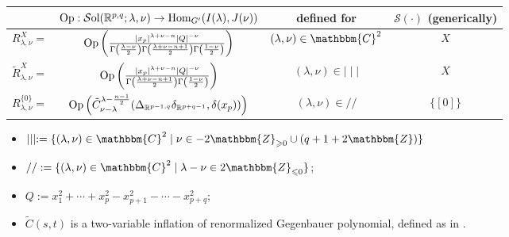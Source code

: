\renewcommand{\arraystretch}{3.5}
\begin{center}
\begin{tabular}{|c|c|c|c|}
  \hline
  & $\operatorname{Op}:\mathcal{S}\mbox{ol}(\mathbb{R}^{p,q};\lambda,\nu)\to\mbox{\normalfont Hom}_{G'}(I(\lambda),J(\nu))$ & defined for &
  $\mathcal{S} (\cdot)$ (generically)\\
  \hline
  $R_{\lambda, \nu}^X=$ & $\mbox{\normalfont Op}\left( \frac{| x_p |^{\lambda + \nu - n} | Q |^{-
  \nu}}{\Gamma \left( \frac{\lambda - \nu}{2} \right) \Gamma \left(
  \frac{\lambda + \nu - n + 1}{2} \right) \Gamma \left( \frac{1 - \nu}{2}
  \right)} \right)$ & $(\lambda,\nu)\in\mathbbm{C}^2$ & $X$\\
  \hline
  $\tilde{R}^X_{\lambda, \nu}=$ & $\mbox{\normalfont Op}\left(  \frac{| x_p |^{\lambda + \nu - n} | Q |^{-
  \nu}}{ \Gamma \left(
  \frac{\lambda + \nu - n + 1}{2} \right) \Gamma \left( \frac{1 - \nu}{2}
  \right)} \right)$ & $(\lambda,\nu)\in\mid \mid \mid$ & $X$\\
  \hline
  $R_{\lambda, \nu}^{\{ 0 \}}=$ & $\mbox{\normalfont Op}\left(  \tilde{C}_{\nu - \lambda}^{\lambda - \frac{n
  - 1}{2}} ({\Delta}_{\mathbb{R}^{p-1,q}} {\delta}_{\mathbb{R}^{p+q-1}}, \delta (x_p)) \right)$ & $(\lambda,\nu)\in/ /$ & $\{ [0]
  \}$\\
  \hline
\end{tabular}
\end{center}

\begin{itemize}
	\item $\mid \mid \mid \assign \{ (\lambda, \nu) \in \mathbbm{C}^2 \mid \nu \in
	- 2\mathbbm{Z}_{\geqslant 0} \cup (q + 1 + 2\mathbbm{Z}) \}$ \item $/ / \assign
\{ (\lambda, \nu) \in \mathbbm{C}^2 \mid \lambda - \nu \in
2\mathbbm{Z}_{\leqslant 0} \}$;
\item $Q:=x_1^2+\cdots+x_p^2-x_{p+1}^2-\cdots-x_{p+q}^2$;
\item $\tilde{C}(s,t)$ is a two-variable inflation of renormalized Gegenbauer polynomial, defined as in \cite{kobayashi2015symmetry}.
\end{itemize}
